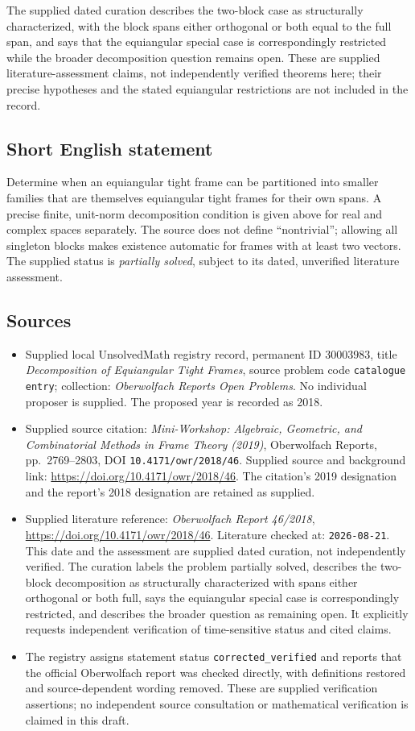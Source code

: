 \documentclass[11pt]{article}
\begin{document}
The supplied dated curation describes the two-block case as structurally characterized, with the block spans either orthogonal or both equal to the full span, and says that the equiangular special case is correspondingly restricted while the broader decomposition question remains open. These are supplied literature-assessment claims, not independently verified theorems here; their precise hypotheses and the stated equiangular restrictions are not included in the record.
\subsection{Short English statement}
Determine when an equiangular tight frame can be partitioned into smaller families that are themselves equiangular tight frames for their own spans. A precise finite, unit-norm decomposition condition is given above for real and complex spaces separately. The source does not define ``nontrivial''; allowing all singleton blocks makes existence automatic for frames with at least two vectors. The supplied status is \emph{partially solved}, subject to its dated, unverified literature assessment.
\subsection{Sources}
\begin{itemize}
\item Supplied local UnsolvedMath registry record, permanent ID \(30003983\), title \emph{Decomposition of Equiangular Tight Frames}, source problem code \texttt{catalogue entry}; collection: \emph{Oberwolfach Reports Open Problems}. No individual proposer is supplied. The proposed year is recorded as 2018.
\item Supplied source citation: \emph{Mini-Workshop: Algebraic, Geometric, and Combinatorial Methods in Frame Theory (2019)}, Oberwolfach Reports, pp.\ 2769--2803, DOI \texttt{10.4171/owr/2018/46}. Supplied source and background link: \url{https://doi.org/10.4171/owr/2018/46}. The citation's 2019 designation and the report's 2018 designation are retained as supplied.
\item Supplied literature reference: \emph{Oberwolfach Report 46/2018}, \url{https://doi.org/10.4171/owr/2018/46}. Literature checked at: \texttt{2026-08-21}. This date and the assessment are supplied dated curation, not independently verified. The curation labels the problem partially solved, describes the two-block decomposition as structurally characterized with spans either orthogonal or both full, says the equiangular special case is correspondingly restricted, and describes the broader question as remaining open. It explicitly requests independent verification of time-sensitive status and cited claims.
\item The registry assigns statement status \texttt{corrected\_verified} and reports that the official Oberwolfach report was checked directly, with definitions restored and source-dependent wording removed. These are supplied verification assertions; no independent source consultation or mathematical verification is claimed in this draft.
\end{itemize}
\end{document}
